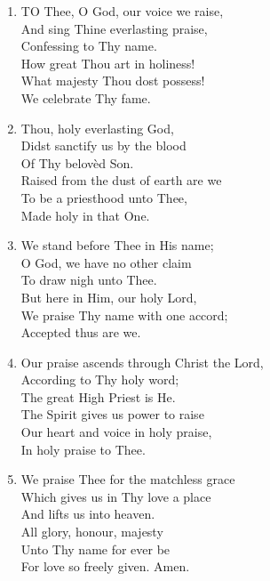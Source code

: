 \documentclass[11pt,a4paper]{article}
\begin{document}
\begin{enumerate}
    \item TO Thee, O God, our voice we raise, \\
        And sing Thine everlasting praise, \\
        Confessing to Thy name. \\
        How great Thou art in holiness! \\
        What majesty Thou dost possess! \\
        We celebrate Thy fame.

    \item Thou, holy everlasting God, \\
        Didst sanctify us by the blood \\
        Of Thy belov\`ed Son. \\
        Raised from the dust of earth are we \\
        To be a priesthood unto Thee, \\
        Made holy in that One.

    \item We stand before Thee in His name; \\
        O God, we have no other claim \\
        To draw nigh unto Thee. \\
        But here in Him, our holy Lord, \\
        We praise Thy name with one accord; \\
        Accepted thus are we.

    \item Our praise ascends through Christ the Lord, \\
        According to Thy holy word; \\
        The great High Priest is He. \\
        The Spirit gives us power to raise \\
        Our heart and voice in holy praise, \\
        In holy praise to Thee.

    \item We praise Thee for the matchless grace \\
        Which gives us in Thy love a place \\
        And lifts us into heaven. \\
        All glory, honour, majesty \\
        Unto Thy name for ever be \\
        For love so freely given. Amen.

\end{enumerate}
\end{document}
